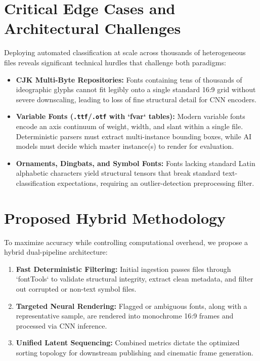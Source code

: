 \documentclass[11pt, onecolumn, a4paper]{article}
\begin{document}
\section{Critical Edge Cases and Architectural Challenges}
Deploying automated classification at scale across thousands of heterogeneous files reveals significant technical hurdles that challenge both paradigms:
\begin{itemize}
    \item \textbf{CJK Multi-Byte Repositories:} Fonts containing tens of thousands of ideographic glyphs cannot fit legibly onto a single standard 16:9 grid without severe downscaling, leading to loss of fine structural detail for CNN encoders.
    \item \textbf{Variable Fonts (\texttt{.ttf}/\texttt{.otf} with `fvar` tables):} Modern variable fonts encode an axis continuum of weight, width, and slant within a single file. Deterministic parsers must extract multi-instance bounding boxes, while AI models must decide which master instance(s) to render for evaluation.
    \item \textbf{Ornaments, Dingbats, and Symbol Fonts:} Fonts lacking standard Latin alphabetic characters yield structural tensors that break standard text-classification expectations, requiring an outlier-detection preprocessing filter.
\end{itemize}

\section{Proposed Hybrid Methodology}
To maximize accuracy while controlling computational overhead, we propose a hybrid dual-pipeline architecture:
\begin{enumerate}
    \item \textbf{Fast Deterministic Filtering:} Initial ingestion passes files through `fontTools` to validate structural integrity, extract clean metadata, and filter out corrupted or non-text symbol files.
    \item \textbf{Targeted Neural Rendering:} Flagged or ambiguous fonts, along with a representative sample, are rendered into monochrome 16:9 frames and processed via CNN inference.
    \item \textbf{Unified Latent Sequencing:} Combined metrics dictate the optimized sorting topology for downstream publishing and cinematic frame generation.
\end{enumerate}
\end{document}
